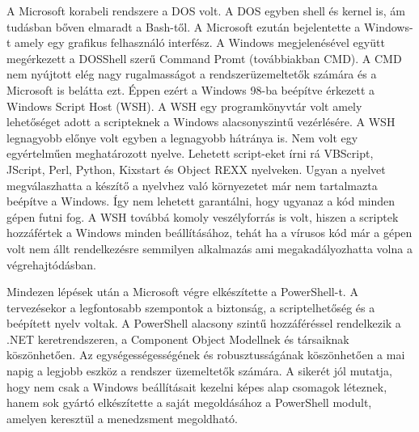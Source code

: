 \documentclass[12pt,oneside,justify,table]{book}
\begin{document}
A Microsoft korabeli rendszere a DOS volt. A DOS egyben shell és kernel is, ám tudásban bőven elmaradt a Bash-től. A Microsoft ezután bejelentette a Windows-t amely egy grafikus felhasználó interfész. A Windows megjelenésével együtt megérkezett a DOSShell szerű Command Promt (továbbiakban CMD). 
A CMD nem nyújtott elég nagy rugalmasságot a rendszerüzemeltetők számára és a Microsoft is belátta ezt. Éppen ezért a Windows 98-ba beépítve érkezett a Windows Script Host (WSH). A WSH egy programkönyvtár volt amely lehetőséget adott a scripteknek a Windows alacsonyszintű vezérlésére.
A WSH legnagyobb előnye volt egyben a legnagyobb hátránya is. Nem volt egy egyértelműen meghatározott nyelve. Lehetett script-eket írni rá VBScript, JScript, Perl, Python, Kixstart és Object REXX nyelveken. Ugyan a nyelvet megválaszhatta a készítő a nyelvhez való környezetet már nem tartalmazta beépítve a Windows. Így nem lehetett garantálni, hogy ugyanaz a kód minden gépen futni fog. A WSH továbbá komoly veszélyforrás is volt, hiszen a scriptek hozzáfértek a Windows minden beállításához, tehát ha a vírusos kód már a gépen volt nem állt rendelkezésre semmilyen alkalmazás ami megakadályozhatta volna a végrehajtódásban.

Mindezen lépések után a Microsoft végre elkészítette a PowerShell-t. A tervezésekor a legfontosabb szempontok a biztonság, a scriptelhetőség és a beépített nyelv voltak. A PowerShell alacsony szintű hozzáféréssel rendelkezik a .NET keretrendszeren, a Component Object Modellnek és társaiknak köszönhetően. Az egységességességének és robusztusságának köszönhetően a mai napig a legjobb eszköz a rendszer üzemeltetők számára. A sikerét jól mutatja, hogy nem csak a Windows beállításait kezelni képes alap csomagok léteznek, hanem sok gyártó elkészítette a saját megoldásához a PowerShell modult, amelyen keresztül a menedzsment megoldható.
\cite{WindowsPowerShellUnleashed}
\end{document}
